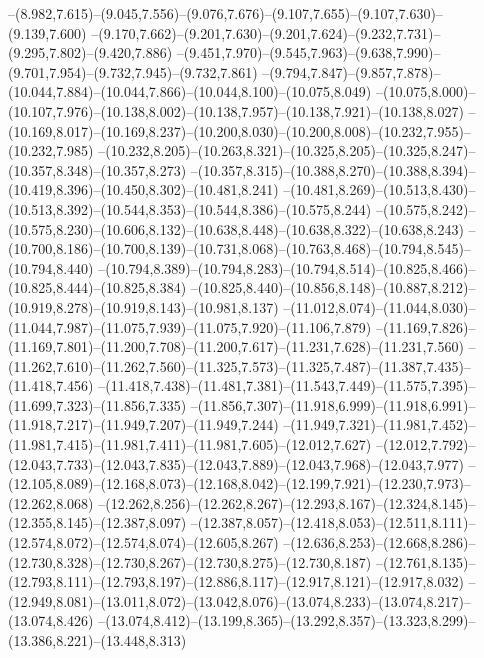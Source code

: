   --(8.982,7.615)--(9.045,7.556)--(9.076,7.676)--(9.107,7.655)--(9.107,7.630)--(9.139,7.600)%
  --(9.170,7.662)--(9.201,7.630)--(9.201,7.624)--(9.232,7.731)--(9.295,7.802)--(9.420,7.886)%
  --(9.451,7.970)--(9.545,7.963)--(9.638,7.990)--(9.701,7.954)--(9.732,7.945)--(9.732,7.861)%
  --(9.794,7.847)--(9.857,7.878)--(10.044,7.884)--(10.044,7.866)--(10.044,8.100)--(10.075,8.049)%
  --(10.075,8.000)--(10.107,7.976)--(10.138,8.002)--(10.138,7.957)--(10.138,7.921)--(10.138,8.027)%
  --(10.169,8.017)--(10.169,8.237)--(10.200,8.030)--(10.200,8.008)--(10.232,7.955)--(10.232,7.985)%
  --(10.232,8.205)--(10.263,8.321)--(10.325,8.205)--(10.325,8.247)--(10.357,8.348)--(10.357,8.273)%
  --(10.357,8.315)--(10.388,8.270)--(10.388,8.394)--(10.419,8.396)--(10.450,8.302)--(10.481,8.241)%
  --(10.481,8.269)--(10.513,8.430)--(10.513,8.392)--(10.544,8.353)--(10.544,8.386)--(10.575,8.244)%
  --(10.575,8.242)--(10.575,8.230)--(10.606,8.132)--(10.638,8.448)--(10.638,8.322)--(10.638,8.243)%
  --(10.700,8.186)--(10.700,8.139)--(10.731,8.068)--(10.763,8.468)--(10.794,8.545)--(10.794,8.440)%
  --(10.794,8.389)--(10.794,8.283)--(10.794,8.514)--(10.825,8.466)--(10.825,8.444)--(10.825,8.384)%
  --(10.825,8.440)--(10.856,8.148)--(10.887,8.212)--(10.919,8.278)--(10.919,8.143)--(10.981,8.137)%
  --(11.012,8.074)--(11.044,8.030)--(11.044,7.987)--(11.075,7.939)--(11.075,7.920)--(11.106,7.879)%
  --(11.169,7.826)--(11.169,7.801)--(11.200,7.708)--(11.200,7.617)--(11.231,7.628)--(11.231,7.560)%
  --(11.262,7.610)--(11.262,7.560)--(11.325,7.573)--(11.325,7.487)--(11.387,7.435)--(11.418,7.456)%
  --(11.418,7.438)--(11.481,7.381)--(11.543,7.449)--(11.575,7.395)--(11.699,7.323)--(11.856,7.335)%
  --(11.856,7.307)--(11.918,6.999)--(11.918,6.991)--(11.918,7.217)--(11.949,7.207)--(11.949,7.244)%
  --(11.949,7.321)--(11.981,7.452)--(11.981,7.415)--(11.981,7.411)--(11.981,7.605)--(12.012,7.627)%
  --(12.012,7.792)--(12.043,7.733)--(12.043,7.835)--(12.043,7.889)--(12.043,7.968)--(12.043,7.977)%
  --(12.105,8.089)--(12.168,8.073)--(12.168,8.042)--(12.199,7.921)--(12.230,7.973)--(12.262,8.068)%
  --(12.262,8.256)--(12.262,8.267)--(12.293,8.167)--(12.324,8.145)--(12.355,8.145)--(12.387,8.097)%
  --(12.387,8.057)--(12.418,8.053)--(12.511,8.111)--(12.574,8.072)--(12.574,8.074)--(12.605,8.267)%
  --(12.636,8.253)--(12.668,8.286)--(12.730,8.328)--(12.730,8.267)--(12.730,8.275)--(12.730,8.187)%
  --(12.761,8.135)--(12.793,8.111)--(12.793,8.197)--(12.886,8.117)--(12.917,8.121)--(12.917,8.032)%
  --(12.949,8.081)--(13.011,8.072)--(13.042,8.076)--(13.074,8.233)--(13.074,8.217)--(13.074,8.426)%
  --(13.074,8.412)--(13.199,8.365)--(13.292,8.357)--(13.323,8.299)--(13.386,8.221)--(13.448,8.313)%

